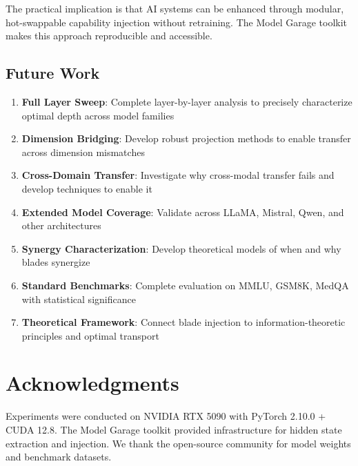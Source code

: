 \documentclass[11pt,a4paper]{article}
\begin{document}
The practical implication is that AI systems can be enhanced through modular, hot-swappable capability injection without retraining. The Model Garage toolkit makes this approach reproducible and accessible.

\subsection{Future Work}

\begin{enumerate}
    \item \textbf{Full Layer Sweep}: Complete layer-by-layer analysis to precisely characterize optimal depth across model families
    \item \textbf{Dimension Bridging}: Develop robust projection methods to enable transfer across dimension mismatches
    \item \textbf{Cross-Domain Transfer}: Investigate why cross-modal transfer fails and develop techniques to enable it
    \item \textbf{Extended Model Coverage}: Validate across LLaMA, Mistral, Qwen, and other architectures
    \item \textbf{Synergy Characterization}: Develop theoretical models of when and why blades synergize
    \item \textbf{Standard Benchmarks}: Complete evaluation on MMLU, GSM8K, MedQA with statistical significance
    \item \textbf{Theoretical Framework}: Connect blade injection to information-theoretic principles and optimal transport
\end{enumerate}

\section*{Acknowledgments}

Experiments were conducted on NVIDIA RTX 5090 with PyTorch 2.10.0 + CUDA 12.8. The Model Garage toolkit provided infrastructure for hidden state extraction and injection. We thank the open-source community for model weights and benchmark datasets.
\end{document}
